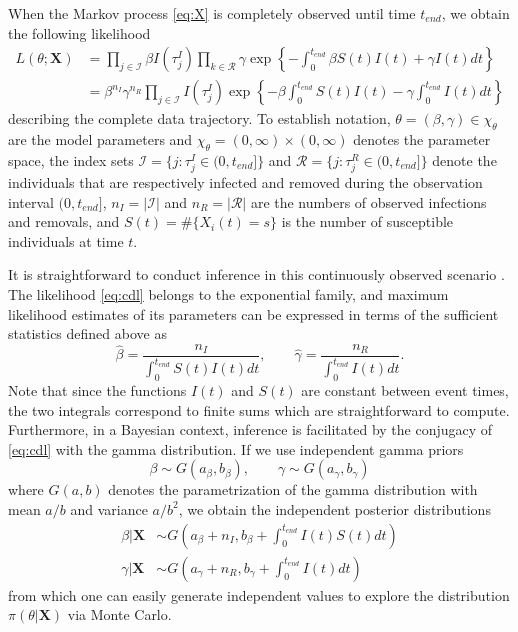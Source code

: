 \documentclass[12pt]{article}
\begin{document}
	When the Markov process \eqref{eq:X} is completely observed until time $t_{end}$, we obtain the following likelihood \citep{Streftaris.2002}
	\begin{align}
		L(\theta; \mathbf{X})
		& = \prod_{j \in \mathcal{I}} \beta I(\tau^I_j) \prod_{k \in \mathcal{R}} \gamma \exp\left\lbrace - \int_{0}^{t_{end}}\beta S(t)I(t) + \gamma I(t) dt \right\rbrace  \nonumber \\
		\label{eq:cdl}
		& = \beta^{n_I} \gamma^{n_R}\prod_{j \in \mathcal{I}} I(\tau^I_j) \exp\left\lbrace - \beta \int_{0}^{t_{end}} S(t)I(t) - \gamma \int_{0}^{t_{end}} I(t) dt \right\rbrace
	\end{align}
	describing the complete data trajectory.
	To establish notation,
	$\theta = (\beta, \gamma) \in \chi_{\theta}$ are the model parameters 
	and $\chi_{\theta} = (0, \infty) \times (0, \infty)$ denotes the parameter space, 
	the index sets $\mathcal{I} = \{j: \tau^I_j \in (0, t_{end}]\}$ and $\mathcal{R} = \{j: \tau^R_j \in (0, t_{end}]\}$ denote the individuals that are respectively infected and removed during the observation interval $(0, t_{end}]$,
	$n_I = |\mathcal{I}|$ and $n_R = |\mathcal{R}|$ are the numbers of observed infections and removals,
	and	$S(t) = \#\{X_i(t) = s\}$ is the number of susceptible individuals at time $t$.
	
	It is straightforward to conduct inference in this continuously observed scenario %
	. The likelihood \eqref{eq:cdl} belongs to the exponential family, and maximum likelihood estimates of its parameters can be expressed in terms of the sufficient statistics defined above as 
	$$
	\hat{\beta} = \dfrac{n_I}{ \int_{0}^{t_{end}} S(t)I(t)dt}, \qquad \hat{\gamma} = \dfrac{n_R}{ \int_{0}^{t_{end}} I(t)dt}.
	$$
	Note that since the functions $I(t)$ and $S(t)$ are constant between event times, the two integrals correspond to finite sums which are straightforward to compute.
	Furthermore, in a Bayesian context, inference is facilitated by the conjugacy of \eqref{eq:cdl} with the gamma distribution. If we use independent gamma priors
	\begin{equation}
		\label{eq:pri}
		\beta \sim G(a_{\beta}, b_{\beta}), \qquad \gamma \sim G(a_{\gamma}, b_{\gamma})
	\end{equation}
	where $G(a,b)$ denotes the parametrization of the gamma distribution with mean $a/b$ and variance $a/b^2$, we obtain the independent posterior distributions
	\begin{align}
		\label{eq:posterior_theta}
		\beta | \mathbf{X} & \sim G\left( a_{\beta} + n_I , b_{\beta} + \int_{0}^{t_{end}} I(t)S(t) dt\right) \\
		\gamma | \mathbf{X} & \sim G\left( a_{\gamma} + n_R, b_{\gamma} + \int_{0}^{t_{end}} I(t) dt\right)
	\end{align}
	from which one can easily generate independent values to explore the distribution $\pi(\theta|\mathbf{X})$ via Monte Carlo.
	
\end{document}
